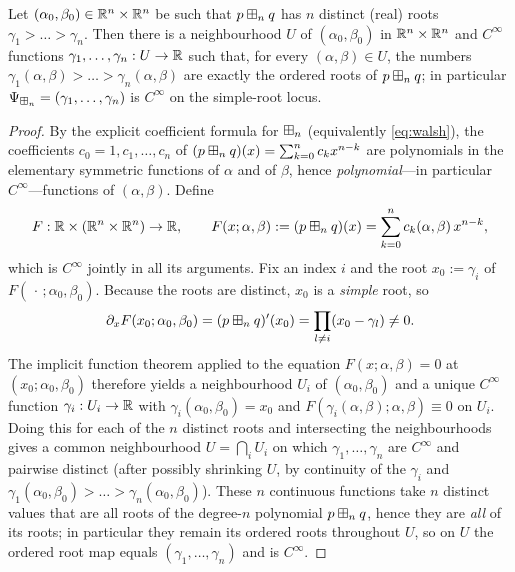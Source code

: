 \begin{qfourlemma}\label{lem:smooth}
Let $(\alpha_0,\beta_0)\in\mathbb{R}^n\times\mathbb{R}^n$ be such that $p\boxplus_n q$
has $n$ distinct (real) roots $\gamma_1>\dots>\gamma_n$. Then there is a
neighbourhood $U$ of $(\alpha_0,\beta_0)$ in $\mathbb{R}^n\times\mathbb{R}^n$ and
$C^\infty$ functions $\gamma_1,\dots,\gamma_n:U\to\mathbb{R}$ such that, for every
$(\alpha,\beta)\in U$, the numbers $\gamma_1(\alpha,\beta)>\dots>\gamma_n(\alpha,\beta)$
are exactly the ordered roots of $p\boxplus_n q$; in particular
$\Psi_{\boxplus_n}=(\gamma_1,\dots,\gamma_n)$ is $C^\infty$ on the simple-root locus.
\end{qfourlemma}

\begin{proof}
By the explicit coefficient formula for $\boxplus_n$ (equivalently \eqref{eq:walsh}),
the coefficients $c_0=1,c_1,\dots,c_n$ of
$(p\boxplus_n q)(x)=\sum_{k=0}^n c_k x^{n-k}$ are polynomials in the elementary
symmetric functions of $\alpha$ and of $\beta$, hence \emph{polynomial}—in
particular $C^\infty$—functions of $(\alpha,\beta)$. Define
\[
F:\mathbb{R}\times(\mathbb{R}^n\times\mathbb{R}^n)\to\mathbb{R},\qquad
F(x;\alpha,\beta):=(p\boxplus_n q)(x)=\sum_{k=0}^n c_k(\alpha,\beta)\,x^{n-k},
\]
which is $C^\infty$ jointly in all its arguments. Fix an index $i$ and the root
$x_0:=\gamma_i$ of $F(\,\cdot\,;\alpha_0,\beta_0)$. Because the roots are
distinct, $x_0$ is a \emph{simple} root, so
\[
\partial_x F(x_0;\alpha_0,\beta_0)=(p\boxplus_n q)'(x_0)
=\prod_{l\ne i}(x_0-\gamma_l)\neq 0 .
\]
The implicit function theorem applied to the equation $F(x;\alpha,\beta)=0$ at
$(x_0;\alpha_0,\beta_0)$ therefore yields a neighbourhood $U_i$ of
$(\alpha_0,\beta_0)$ and a unique $C^\infty$ function
$\gamma_i:U_i\to\mathbb{R}$ with $\gamma_i(\alpha_0,\beta_0)=x_0$ and
$F(\gamma_i(\alpha,\beta);\alpha,\beta)\equiv 0$ on $U_i$. Doing this for each of
the $n$ distinct roots and intersecting the neighbourhoods gives a common
neighbourhood $U=\bigcap_i U_i$ on which $\gamma_1,\dots,\gamma_n$ are $C^\infty$
and pairwise distinct (after possibly shrinking $U$, by continuity of the
$\gamma_i$ and $\gamma_1(\alpha_0,\beta_0)>\dots>\gamma_n(\alpha_0,\beta_0)$).
These $n$ continuous functions take $n$ distinct values that are all roots of the
degree-$n$ polynomial $p\boxplus_n q$, hence they are \emph{all} of its roots; in
particular they remain its ordered roots throughout $U$, so on $U$ the ordered
root map equals $(\gamma_1,\dots,\gamma_n)$ and is $C^\infty$.
\end{proof}

